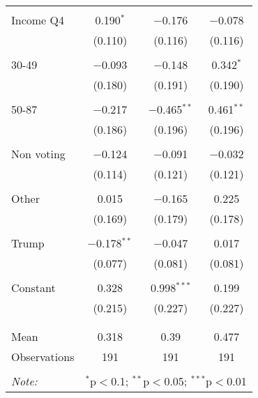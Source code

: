 \begin{tabular}{@{\extracolsep{5pt}}lccc}
  & & & \\ 
 Income Q4 & 0.190$^{*}$ & $-$0.176 & $-$0.078 \\ 
  & (0.110) & (0.116) & (0.116) \\ 
  & & & \\ 
 30-49 & $-$0.093 & $-$0.148 & 0.342$^{*}$ \\ 
  & (0.180) & (0.191) & (0.190) \\ 
  & & & \\ 
 50-87 & $-$0.217 & $-$0.465$^{**}$ & 0.461$^{**}$ \\ 
  & (0.186) & (0.196) & (0.196) \\ 
  & & & \\ 
 Non voting & $-$0.124 & $-$0.091 & $-$0.032 \\ 
  & (0.114) & (0.121) & (0.121) \\ 
  & & & \\ 
 Other & 0.015 & $-$0.165 & 0.225 \\ 
  & (0.169) & (0.179) & (0.178) \\ 
  & & & \\ 
 Trump & $-$0.178$^{**}$ & $-$0.047 & 0.017 \\ 
  & (0.077) & (0.081) & (0.081) \\ 
  & & & \\ 
 Constant & 0.328 & 0.998$^{***}$ & 0.199 \\ 
  & (0.215) & (0.227) & (0.227) \\ 
  & & & \\ 
\hline \\[-1.8ex] 
Mean & 0.318 & 0.39 & 0.477 \\ 
Observations & 191 & 191 & 191 \\ 
\hline 
\hline \\[-1.8ex] 
\textit{Note:}  & \multicolumn{3}{r}{$^{*}$p$<$0.1; $^{**}$p$<$0.05; $^{***}$p$<$0.01} \\ 
\end{tabular} 
